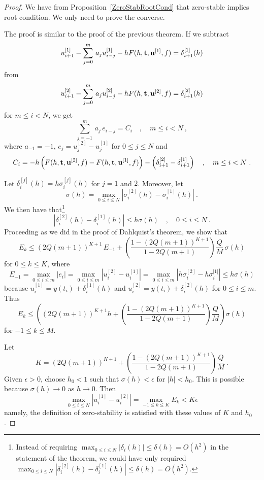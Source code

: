 \begin{proof}
We have from Proposition~\ref{ZeroStabRootCond} that zero-stable implies
root condition.  We only need to prove the converse.

The proof is similar to the proof of the previous theorem.
If we subtract
\[
u_{i+1}^{[1]} - \sum_{j=0}^m\,a_j u_{i-j}^{[1]} - h
F(h,\mathbf{t},\mathbf{u}^{[1]},f) = \delta_{i+1}^{[1]}(h)
\]
from
\[
u_{i+1}^{[2]} - \sum_{j=0}^m\,a_j u_{i-j}^{[2]} - h
F(h,\mathbf{t},\mathbf{u}^{[2]},f) = \delta_{i+1}^{[2]}(h)
\]
for $m \leq i < N$, we get
\[
\sum_{j=-1}^m\,a_j\,e_{i-j} = C_i \quad , \quad  m \leq i < N \ ,
\]
where $a_{-1} = -1$, $\displaystyle e_j = u_j^{[2]} - u_j^{[1]}$ for
$0 \leq j \leq N$ and
\[
C_i = -h \left( F(h,\mathbf{t},\mathbf{u}^{[2]},f)
- F(h,\mathbf{t},\mathbf{u}^{[1]},f) \right) -
\left( \delta_{i+1}^{[2]}- \delta_{i+1}^{[1]} \right)
\quad , \quad m \leq i < N \ .
\]

Let $\delta_i^{[j]}(h) = h \sigma_i^{[j]}(h)$ for $j=1$ and $2$.
Moreover, let
\[
\sigma(h) = \max_{0\leq i \leq N} \left|\sigma_i^{[2]}(h)
- \sigma_i^{[1]}(h)\right| \ .
\]
We then have that\footnote{Instead of requiring
$\displaystyle \max_{0 \leq i \leq N} | \delta_i(h) | \leq
\delta(h) = O(h^2)$ in the statement of the theorem, we could have only
required
$\displaystyle \max_{0 \leq i \leq N}
\left| \delta_i^{[2]}(h) - \delta_i^{[1]}(h) \right| \leq
\delta(h) = O(h^2)$.}
\[
  \left| \delta_i^{[2]}(h) - \delta_i^{[1]}(h) \right| \leq h \sigma(h)
\quad , \quad 0 \leq i \leq N \ .
\]
Proceeding as we did in the proof of Dahlquist's theorem, we show that
\[
E_k \leq
(2Q(m+1))^{K+1}\,E_{-1} + \left(\frac{1-(2Q(m+1))^{K+1}}{1-2Q(m+1)}\right)
\frac{Q}{M}\,\sigma(h)
\]
for $0\leq k \leq K$, where
\[
E_{-1} = \max_{0 \leq i \leq m} \left| e_i\right|
= \max_{0 \leq i \leq m} \left| u_i^{[2]}- u_i^{[1]} \right|
= \max_{0 \leq i \leq m} \left| h\sigma_i^{[2]} - h \sigma_i^{[1[} \right|
\leq h \sigma(h)
\]
because $\displaystyle u_i^{[1]} = y(t_i) + \delta_i^{[1]}(h)$ and
$\displaystyle u_i^{[2]} = y(t_i) + \delta_i^{[2]}(h)$ for
$0\leq i \leq m$.  Thus
\[
E_k \leq \left(
(2Q(m+1))^{K+1}h + \left(\frac{1-(2Q(m+1))^{K+1}}{1-2Q(m+1)}\right)
\frac{Q}{M}\right) \sigma(h)
\]
for $-1 \leq k \leq M$.

Let
\[
  K = (2Q(m+1))^{K+1} + \left(\frac{1-(2Q(m+1))^{K+1}}{1-2Q(m+1)}\right)
  \frac{Q}{M} \ .
\]
Given $\epsilon >0$, choose $h_0<1$ such that
$\sigma(h) < \epsilon$ for $|h|<h_0$.  This is possible because
$\sigma(h) \to 0$ as $h \to 0$.  Then
\[
\max_{0\leq i \leq N} | u_i^{[1]} - u_i^{[2]} |
= \max_{-1\leq k \leq K} E_k < K \epsilon
\]
namely, the definition of zero-stability is satisfied with these values
of $K$ and $h_0$. 
\end{proof}

